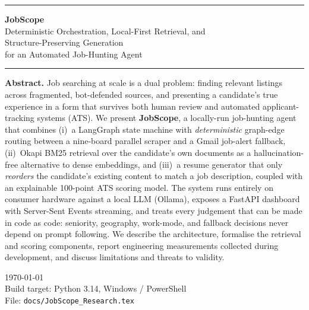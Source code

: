 \documentclass[11pt,a4paper]{article}
\newcommand{\file}[1]{\texttt{\small #1}}
\begin{document}
\begin{titlepage}
  \centering
  \vspace*{2.2cm}
  {\color{indigo}\rule{\textwidth}{2pt}}

  \vspace{0.9cm}
  {\fontsize{30}{36}\selectfont\bfseries\color{indigo} JobScope}\\[8pt]
  {\Large Deterministic Orchestration, Local-First Retrieval, and\\[2pt]
   Structure-Preserving Generation\\[4pt]
   for an Automated Job-Hunting Agent}

  \vspace{0.8cm}
  {\color{indigo}\rule{\textwidth}{2pt}}

  \vspace{2.2cm}
  \begin{minipage}{0.82\textwidth}
    \small
    \textbf{Abstract.}
    Job searching at scale is a dual problem: finding relevant listings across
    fragmented, bot-defended sources, and presenting a candidate's true
    experience in a form that survives both human review and automated
    applicant-tracking systems (ATS). We present \textbf{JobScope}, a
    locally-run job-hunting agent that combines (i)~a LangGraph state machine
    with \emph{deterministic} graph-edge routing between a nine-board parallel
    scraper and a Gmail job-alert fallback, (ii)~Okapi BM25 retrieval over the
    candidate's own documents as a hallucination-free alternative to dense
    embeddings, and (iii)~a resume generator that only \emph{reorders} the
    candidate's existing content to match a job description, coupled with an
    explainable 100-point ATS scoring model. The system runs entirely on
    consumer hardware against a local LLM (Ollama), exposes a FastAPI
    dashboard with Server-Sent Events streaming, and treats every judgement
    that can be made in code as code: seniority, geography, work-mode, and
    fallback decisions never depend on prompt following. We describe the
    architecture, formalise the retrieval and scoring components, report
    engineering measurements collected during development, and discuss
    limitations and threats to validity.
  \end{minipage}

  \vfill
  {\small \today \\[2pt]
   Build target: Python 3.14, Windows / PowerShell \\[2pt]
   File: \file{docs/JobScope\_Research.tex}}
\end{titlepage}
\end{document}
